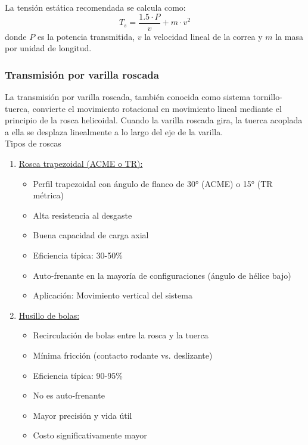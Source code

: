 La tensión estática recomendada se calcula como:
\begin{equation}
    T_s = \frac{1.5 \cdot P}{v} + m \cdot v^2
\end{equation}
donde $P$ es la potencia transmitida, $v$ la velocidad lineal de la correa y $m$ la masa por unidad de longitud.

\subsubsection{Transmisión por varilla roscada}

La transmisión por varilla roscada, también conocida como sistema tornillo-tuerca, convierte el movimiento rotacional en movimiento lineal mediante el principio de la rosca helicoidal. Cuando la varilla roscada gira, la tuerca acoplada a ella se desplaza linealmente a lo largo del eje de la varilla.\\

Tipos de roscas
\begin{enumerate}
    \item \underline{Rosca trapezoidal (ACME o TR):}
    \begin{itemize}[label=$\bullet$]
        \item Perfil trapezoidal con ángulo de flanco de 30° (ACME) o 15° (TR métrica)
        \item Alta resistencia al desgaste
        \item Buena capacidad de carga axial
        \item Eficiencia típica: 30-50\%
        \item Auto-frenante en la mayoría de configuraciones (ángulo de hélice bajo)
        \item Aplicación: Movimiento vertical del sistema
    \end{itemize}

    \item \underline{Husillo de bolas:}
    \begin{itemize}[label=$\bullet$]
        \item Recirculación de bolas entre la rosca y la tuerca
        \item Mínima fricción (contacto rodante vs. deslizante)
        \item Eficiencia típica: 90-95\%
        \item No es auto-frenante
        \item Mayor precisión y vida útil
        \item Costo significativamente mayor\\
    \end{itemize}
\end{enumerate}


